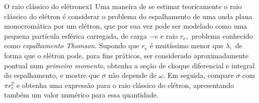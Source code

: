 \begin{exercício}{O raio clássico do elétron}{ex1}
   Uma maneira de se estimar teoricamente o raio clássico do elétron é considerar o problema do espalhamento de uma onda plana monocromática por um elétron, que por sua vez pode ser modelado como uma pequena partícula esférica carregada, de carga \(-e\) e raio \(r_e,\) problema conhecido como \emph{espalhamento Thomson.} Supondo que \(r_e\) é muitíssimo menor que \(\lambda,\) de forma que o elétron pode, para fins práticos, ser considerado aproximadamente pontual num \emph{primeiro momento}, obtenha a seção de choque diferencial e integral do espalhamento, e mostre que \(\sigma\) não depende de \(\omega.\) Em seguida, compare \(\sigma\) com \(\pi r_e^2\) e obtenha uma expressão para o raio clássico do elétron, apresentando também um valor numérico para essa quantidade.
\end{exercício}

